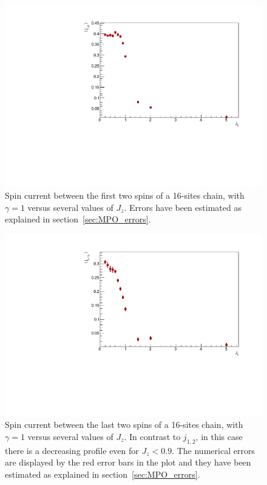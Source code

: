 \begin{figure}[H]
    \centering
    \captionsetup{width=1.\linewidth}
    \includegraphics[scale=0.6]{Figures/SpinCurrVSJz1st.pdf}
    \caption{Spin current between the first two spins of a 16-sites chain, with $\gamma=1$ versus several values of $J_z$. Errors have been estimated as explained in section~\ref{sec:MPO_errors}.}
    \label{fig:SpinCurrVSJz1st}
\end{figure}

\begin{figure}[H]
    \centering
    \captionsetup{width=1.\linewidth}
    \includegraphics[scale=0.6]{Figures/SpinCurrVSJzLth.pdf}
    \caption{Spin current between the last two spins of a 16-sites chain, with $\gamma=1$ versus several values of $J_z$. In contrast to $j_{1,2}$, in this case there is a decreasing profile even for $J_z < 0.9$. The numerical errors are displayed by the red error bars in the plot and they have been estimated as explained in section~\ref{sec:MPO_errors}.}
    \label{fig:SpinCurrVSJzLth}
\end{figure}